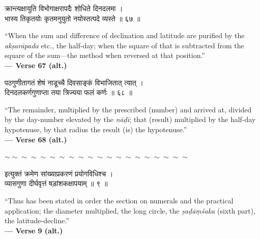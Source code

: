 \documentclass[11pt,a4paper]{article}
\newcommand{\dev}[1]{{\devanagarifont #1}}
\newenvironment{bilingualverse}{%
  \begin{paracol}{2}
  \fontsize{10.5}{13}\selectfont
}{%
  \end{paracol}
  \vspace{0.3cm}
}
\newcommand{\wavydivider}{\begin{center}$\sim\sim\sim\sim\sim\sim\sim\sim\sim\sim\sim\sim\sim\sim\sim\sim\sim\sim\sim\sim$\end{center}}
\newenvironment{paracol}[1]{\begingroup}{\endgroup}
\newenvironment{leftcolumn*}{\begingroup}{\endgroup}
\newenvironment{rightcolumn}{\begingroup}{\endgroup}
\begin{document}
\begin{bilingualverse}
\begin{leftcolumn*}
\dev{क्रान्त्यक्षायुति विभोगाक्षरापदैः शोधिते दिनदलमा ।}\\
\dev{भास्य तिकृतयोः कृतमनुयुतो नयोस्तत्पदे व्यस्ते ॥ ६७ ॥}
\end{leftcolumn*}
\begin{rightcolumn}
``When the sum and difference of declination and latitude are purified by the \textit{akṣarāpada} etc., the half-day; when the square of that is subtracted from the square of the sum---the method when reversed at that position.''\\[0.3cm]
\hfill\textbf{— Verse 67 (alt.)}
\end{rightcolumn}
\end{bilingualverse}

\begin{bilingualverse}
\begin{leftcolumn*}
\dev{पठगुणीतागतं शेषं नाडूच्चै दिवसाङ्कं विभाजितात् त्यात् ।}\\
\dev{दिनदलकर्णगुणाप्ता तया त्रिज्यया फलं कर्णः ॥ ६८ ॥}
\end{leftcolumn*}
\begin{rightcolumn}
``The remainder, multiplied by the prescribed (number) and arrived at, divided by the day-number elevated by the \textit{nāḍī}; that (result) multiplied by the half-day hypotenuse, by that radius the result (is) the hypotenuse.''\\[0.3cm]
\hfill\textbf{— Verse 68 (alt.)}
\end{rightcolumn}
\end{bilingualverse}

\wavydivider

\begin{bilingualverse}
\begin{leftcolumn*}
\dev{इत्युक्तं क्रमेण सांख्याप्रकरणं प्रयोगविधिश्च ।}\\
\dev{व्यासगुणा दीर्घवृत्तं षड़ांशकक्षापयाम् ॥ ९ ॥}
\end{leftcolumn*}
\begin{rightcolumn}
``Thus has been stated in order the section on numerals and the practical application; the diameter multiplied, the long circle, the \textit{ṣaḍāṃśaka} (sixth part), the latitude-decline.''\\[0.3cm]
\hfill\textbf{— Verse 9 (alt.)}
\end{rightcolumn}
\end{bilingualverse}
\end{document}
